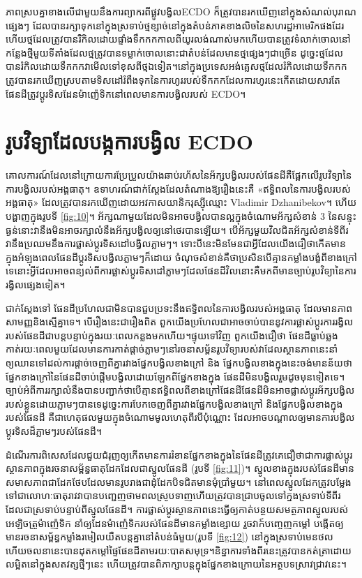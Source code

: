 \documentclass[10pt,twocolumn,letterpaper]{article}
\begin{document}
ភាពស្របគ្នាខាងលើជាមួយនឹងការព្យាករពីផ្លូវបង្វិល​ECDO ក៏ត្រូវបានរកឃើញនៅក្នុងសំណល់បុរាណផ្សេងៗ ដែលបានរក្សាទុកនៅក្នុងស្រទាប់ថ្មខ្សាច់នៅក្នុងតំបន់ភាគខាងលិចនៃសហរដ្ឋអាមេរិកផងដែរ \cite{21} ហើយថ្មដែលត្រូវបានរំិកិលដោយផ្ទាំងទឹកកកកាលពីយូរលង់ណាស់មកហើយបានត្រូវទំលាក់ចោលនៅកន្លែងថ្មីមួយ​ទីតាំងដែលថ្មត្រូវបានទម្លាក់ចោលនោះជាតំបន់ដែលមានថ្មផ្សេងៗជាច្រើន ដូច្នេះថ្មដែលបានរំកិលដោយទឹកកកវាមើលទៅខុសពីថ្មឯទៀត។នៅក្នុងប្រទេសអង់គ្លេស​ថ្មដែលរំកិលដោយទឹកកកត្រូវបានរកឃើញស្របតាមទិសដៅរំពឹងទុកនៃការហូររបស់ទឹកកក​ដែលការហូរនេះកើតដោយសារតែផែនដីត្រូវប្តូរទិសដែនម៉ាញ៉េទិកនៅពេលមានការបង្វិលរបស់ ECDO\cite{67,68}។

\section{រូបវិទ្យាដែលបង្កការបង្វិល ECDO}

គោលការណ៍ដែលនៅក្រោយការប្រែប្រួលយ៉ាងឆាប់រហ័សនៃអ័ក្សបង្វិលរបស់ផែនដីគឺផ្អែកលើរូបវិទ្យានៃការបង្វិលរបស់អង្គធាតុ។ ឧទាហរណ៍ជាក់ស្តែងដែលតំណាងឱ្យរឿងនេះគឺ «ឥទ្ធិពលនៃការបង្វិលរបស់អង្គធាតុ»  ដែលត្រូវបានរកឃើញដោយអវកាសយានិករុស្ស៊ីឈ្មោះ Vladimir Dzhanibekov។ \cite{37} ហើយបង្ហាញក្នុងរូបទី \ref{fig:10}។ អ័ក្សណាមួយដែលមិនអាចបង្វិលបានល្អក្នុងចំណោមអ័ក្សសំខាន់ 3 នៃសន្ទុះធ្ងន់នោះវានឹងមិនអាចរក្សាលំនឹងអ័ក្សបង្វិលឲ្យនៅថេរបានឡើយ។ បើអ័ក្សមួយវិលជិតអ័ក្សសំខាន់ទីពីរ វានឹងប្រឈមនឹងការផ្លាស់ប្តូរទិសដៅបង្វិលភ្លាមៗ។ ទោះបីនេះមិនមែនជាអ្វីដែលយើងជឿថាកើតមានក្នុងអំឡុងពេលផែនដីប្តូរទិសបង្វិលភ្លាមៗក៏ដោយ ចំណុចសំខាន់គឺថាប្រសិនបើគ្មានកម្លាំងបង្ខំពីខាងក្រៅទេនោះអ្វីដែលអាចពន្យល់ពីការផ្លាស់ប្តូរទិសដៅភ្លាមៗដែលផែនដីវិល​នោះគឺមកពីមានច្បាប់រូបវិទ្យានៃការរង្វិលផ្សេងទៀត។​

ជាក់ស្តែងទៅ ផែនដីប្រហែលជាមិនបានជួបប្រទះនឹងឥទ្ធិពលនៃការបង្វិលរបស់អង្គធាតុ ដែលមានភាពសាមញ្ញនិងស្មើគ្នាទេ។ បើរឿងនេះជារឿងពិត ពួកយើងប្រហែលជាអាចចាប់បាននូវការផ្លាស់ប្តូរការរង្វិលរបស់ផែនដីជាបន្តបន្ទាប់ក្នុងរយៈពេលកន្លងមកហើយ។ផ្ទុយទៅវិញ ពួកយើងជឿថា ផែនដីធ្លាប់ឆ្លងកាត់រយៈពេលមួយដែលមានការកាត់ផ្តាច់ភ្លាមៗនៅរចនាសម្ព័នរូបវិទ្យារបស់វា​ដែលស្ថានភាពនេះនាំឲ្យឈានទៅដល់ការផ្ដាច់ចេញពីគ្នារវាងផ្នែកបង្វិលខាងក្រៅ និង ផ្នែកបង្វិលខាងក្នុងនេះចង់មានន័យថា ផ្នែកខាងក្រៅនៃផែនដីចាប់ផ្តើមបង្វិលដោយឡែកពីផ្នែកខាងក្នុង ផែនដីមិនបង្វិលរួមដូចមុនទៀតទេ។ច្បាប់អំពីការរក្សាលំនឹងបានបញ្ជាក់ថា​បើគ្មានឥទ្ធិពលពីខាងក្រៅផែនដី​ផែនដីមិនអាចផ្លាស់ប្តូរអ័ក្សបង្វិលរបស់ខ្លួនដោយភ្លាមៗបានទេ​ដូច្នេះការបែកចេញពីគ្នារវាងផ្នែកបង្វិលខាងក្រៅ និងផ្នែកបង្វិលខាងក្នុងរបស់ផែនដី គឺជាហេតុផលមួយក្នុងចំណោមមូលហេតុពីរ​បីប៉ុណ្ណោះ ដែលអាចបណ្តាលឲ្យមានការបង្វិលប្តូរទិសដ៏ភ្លាមៗរបស់ផែនដី។

ដំណើរការពិសេសដែលជួយជំរុញឲ្យកើតមានការរំខានផ្នែកខាងក្នុងនៃផែនដីត្រូវគេជឿថាជាការផ្លាស់ប្តូរស្ថានភាពក្នុងរចនាសម្ព័ន្ធធាតុដែកដែលជាស្នូលផែនដី (រូបទី \ref{fig:11})។ ស្នូលខាងក្នុងរបស់ផែនដីមានសមាសភាពជាដែកថែបដែលមានរូបរាងជាដុំដែកបិទជិតមានមុំប្រាំមួយ\cite{141}។ នៅពេលស្នូលដែកត្រូវបម្លែងទៅជាលោហៈធាតុរាវ​វាបានបញ្ជេញថាមពលស្រូបទាញ​ហើយត្រូវបានជ្រាបចូលទៅក្នងស្រទាប់ទីពីរដែលជាស្រទាប់បន្ទាប់ពីស្នូលផែនដី។ ការផ្លាស់ប្តូរស្ថានភាពនេះធ្វើឲ្យកាត់បន្ថយសមត្ថភាពស្នូលរបស់អេឡិចត្រូម៉ាញ៉េទិក នាំឲ្យដែនម៉ាញ៉េទិករបស់ផែនដីមានកម្លាំងខ្សោយ រួចវាក៍បញ្ចេញកម្តៅ បង្កើតឲ្យមានរចនាសម្ព័ន្ធកម្លាំងរមៀលយឺតបន្តគ្នានៅតំបន់ធំមួយ(រូបទី \ref{fig:12}) \cite{38} នៅក្នុងស្រទាប់មេនថល ហើយចលនានេះបានដុតកម្តៅផ្ទៃផែនដីតាមរយៈបាតសមុទ្រ។និន្នាការទាំងពីរនេះត្រូវបានកត់ត្រាដោយលម្អិតនៅក្នុងសតវត្សថ្មីៗនេះ ហើយត្រូវបានពិភាក្សាបន្ដក្នុងផ្នែកខាងក្រោយនៃអត្ថបទស្រាវជ្រាវនេះ។
\end{document}
